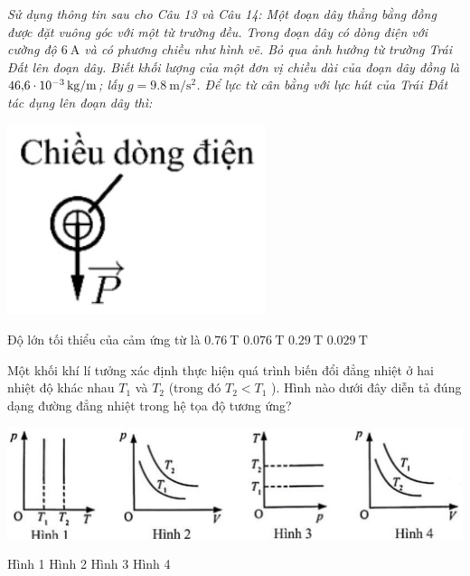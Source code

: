 \textit{Sử dụng thông tin sau cho Câu 13 và Câu 14: Một đoạn dây thẳng bằng đồng được đặt vuông góc với một từ trường đều. Trong đoạn dây có dòng điện với cường độ $\SI{6}{\ampere}$ và có phương chiều như hình vẽ. Bỏ qua ảnh hưởng từ trường Trái Đất lên đoạn dây. Biết khối lượng của một đơn vị chiều dài của đoạn dây đồng là $\SI{46.6E-3}{\kilogram/\meter}$; lấy $g=\SI{9.8}{\meter/\second^2}$. Để lực từ cân bằng với lực hút của Trái Đất tác dụng lên đoạn dây thì:}
\begin{ex}
	{\includegraphics[scale=0.6]{../figs/FINAL-SEM1-004-3}}
	\loigiai{}
\end{ex}
\begin{ex}
	Độ lớn tối thiểu của cảm ứng từ là
	\choice
	{$\SI{0.76}{\tesla}$}
	{$\SI{0.076}{\tesla}$}
	{$\SI{0.29}{\tesla}$}
	{$\SI{0.029}{\tesla}$}
	\loigiai{}
\end{ex}
\begin{ex}
	Một khối khí lí tưởng xác định thực hiện quá trình biến đổi đẳng nhiệt ở hai nhiệt độ khác nhau $T_1$ và $T_2$ (trong đó $T_2<T_1$ ). Hình nào dưới đây diễn tả đúng dạng đường đẳng nhiệt trong hệ tọa độ tương ứng?
	\begin{center}
		\includegraphics[scale=0.7]{../figs/FINAL-SEM1-004-4}
	\end{center}
	\choice
	{Hình 1}
	{Hình 2}
	{Hình 3}
	{Hình 4}
	\loigiai{}
\end{ex}
